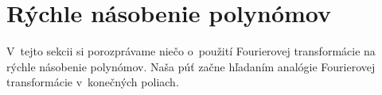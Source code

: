 \section{Rýchle násobenie polynómov}

V~tejto sekcii si porozprávame niečo o~použití Fourierovej
transformácie na rýchle násobenie polynómov. Naša púť začne hľadaním
analógie Fourierovej transformácie v~konečných poliach.

%
%
%

